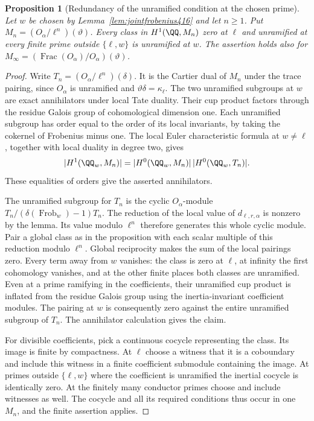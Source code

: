 \documentclass[a4paper,11pt]{article}
\newtheorem{proposition}{Proposition}[section]
\theoremstyle{definition}
\theoremstyle{remark}
\numberwithin{equation}{section}
\begin{document}
\begin{proposition}[Redundancy of the unramified condition at the chosen prime]\leavevmode
\label{prop:oneprimerelax416}
Let \(w\) be chosen by Lemma~\ref{lem:jointfrobenius416} and
let \(n\ge1\). Put \(M_n=(O_\alpha/\ell^n)(\vartheta)\).
Every class in \(H^1(\QQ,M_n)\) zero at \(\ell\) and unramified
at every finite prime outside \(\{\ell,w\}\) is unramified at
\(w\). The assertion holds also for
\(M_\infty=(\operatorname{Frac}(O_\alpha)/O_\alpha)(\vartheta)\).
\end{proposition}
\begin{proof}
Write \(T_n=(O_\alpha/\ell^n)(\delta)\). It is the Cartier dual
of \(M_n\) under the trace pairing, since \(O_\alpha\) is
unramified and \(\vartheta\delta=\kappa_\ell\).
The two unramified subgroups at \(w\) are exact annihilators
under local Tate duality. Their cup product factors through the
residue Galois group of cohomological dimension one. Each
unramified subgroup has order equal to the order of its
local invariants, by taking the cokernel of Frobenius minus one.
The local Euler characteristic formula at \(w\ne\ell\), together
with local duality in degree two, gives
\[
 |H^1(\QQ_w,M_n)|=
       |H^0(\QQ_w,M_n)|\,|H^0(\QQ_w,T_n)|.
\]
These equalities of orders give the asserted annihilators.

The unramified subgroup for \(T_n\) is the cyclic
\(O_\alpha\)-module \(T_n/(\delta(\operatorname{Frob}_w)-1)T_n\).
The reduction of the local value of \(d_{\ell,r,\alpha}\)
is nonzero by the lemma. Its value modulo \(\ell^n\) therefore
generates this whole cyclic module. Pair a global class as in
the proposition with each scalar multiple of this reduction
modulo \(\ell^n\). Global reciprocity makes the sum of the
local pairings zero. Every term away from \(w\) vanishes:
the class is zero at \(\ell\), at infinity the first cohomology
vanishes, and at the other finite places both classes are
unramified. Even at a prime ramifying in the coefficients,
their unramified cup product is inflated from the residue
Galois group using the inertia-invariant coefficient modules.
The pairing at \(w\) is consequently zero against the entire
unramified subgroup of \(T_n\). The annihilator calculation
gives the claim.~\cite[I, Sections~2 and~4]{IX-VII-V-milne98}

For divisible coefficients, pick a continuous cocycle representing
the class. Its image is finite by compactness. At \(\ell\) choose
a witness that it is a coboundary and include this witness in
a finite coefficient submodule containing the image. At primes
outside \(\{\ell,w\}\) where the coefficient is unramified the
inertial cocycle is identically zero. At the finitely many
conductor primes choose and include witnesses as well. The
cocycle and all its required conditions thus occur in one
\(M_n\), and the finite assertion applies.
\end{proof}
\end{document}
